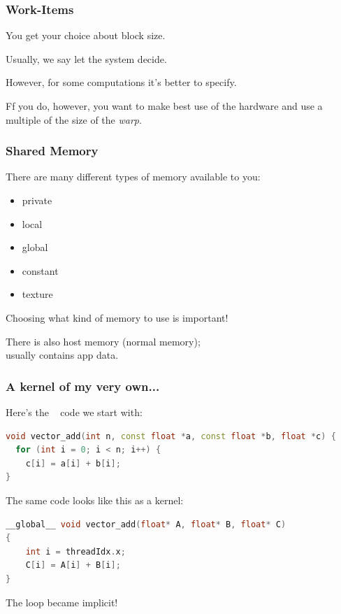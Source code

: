 \begin{frame}
\frametitle{Work-Items}
    
You get your choice about block size. 

Usually, we say let the system decide. 

However, for some computations it's better to specify.

Ff you do, however, you want to make best use of the hardware and use a multiple of the size of the \textit{warp}.


\end{frame}

\begin{frame}
  \frametitle{Shared Memory}


  There are many different types of memory available to you:


\begin{itemize}
\item private
\item local
\item global
\item constant
\item texture
\end{itemize}

Choosing what kind of memory to use is important!

There is also host memory (normal memory);\\ usually contains app data.

\end{frame}


\begin{frame}[fragile]
\frametitle{A kernel of my very own...}

Here's the \CPP~ code we start with:

\begin{lstlisting}[language=C++]
void vector_add(int n, const float *a, const float *b, float *c) {
  for (int i = 0; i < n; i++) {
    c[i] = a[i] + b[i];
}
\end{lstlisting}


The same code looks like this as a kernel:
\begin{lstlisting}[language=C++]
__global__ void vector_add(float* A, float* B, float* C)
{
    int i = threadIdx.x;
    C[i] = A[i] + B[i];
}
\end{lstlisting}

The loop became implicit!

\end{frame}


